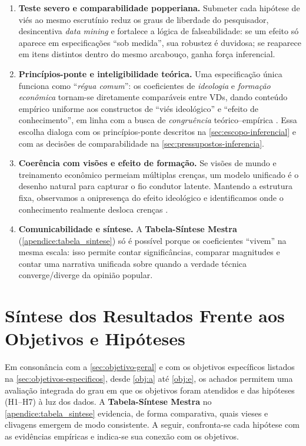 \begin{enumerate}[label=\roman*)]
\item \textbf{Teste severo e comparabilidade popperiana.} Submeter cada hipótese de viés ao mesmo escrutínio reduz os graus de liberdade do pesquisador, desincentiva \emph{data mining} e fortalece a lógica de falseabilidade: se um efeito só aparece em especificações “sob medida”, sua robustez é duvidosa; se reaparece em itens distintos dentro do mesmo arcabouço, ganha força inferencial.

\item \textbf{Princípios-ponte e inteligibilidade teórica.} Uma especificação única funciona como “\emph{régua comum}”: os coeficientes de \emph{ideologia} e \emph{formação econômica} tornam-se diretamente comparáveis entre VDs, dando conteúdo empírico uniforme aos constructos de “viés ideológico” e “efeito de conhecimento”, em linha com a busca de \emph{congruência} teórico–empírica \cite{stigum2003}. Essa escolha dialoga com os princípios-ponte descritos na \autoref{sec:escopo-inferencial} e com as decisões de comparabilidade na \autoref{sec:pressupostos-inferencia}.

\item \textbf{Coerência com visões e efeito de formação.} Se visões de mundo e treinamento econômico permeiam múltiplas crenças, um modelo unificado é o desenho natural para capturar o fio condutor latente. Mantendo a estrutura fixa, observamos a onipresença do efeito ideológico e identificamos onde o conhecimento realmente desloca crenças \cite{sowell2007conflict,newman2020ideia}. 

\item \textbf{Comunicabilidade e síntese.} A \textbf{Tabela-Síntese Mestra} (\autoref{apendice:tabela_sintese}) só é possível porque os coeficientes “vivem” na mesma escala: isso permite contar significâncias, comparar magnitudes e contar uma narrativa unificada sobre quando a verdade técnica converge/diverge da opinião popular.
\end{enumerate}

\section{Síntese dos Resultados Frente aos Objetivos e Hipóteses}\label{sec:sintese-resultados}

Em consonância com a \autoref{sec:objetivo-geral} e com os objetivos específicos listados na \autoref{sec:objetivos-especificos}, desde \autoref{obj:a} até \autoref{obj:e}, os achados permitem uma avaliação integrada do grau em que os objetivos foram atendidos e das hipóteses (H1–H7) à luz dos dados. A \textbf{Tabela-Síntese Mestra} no \autoref{apendice:tabela_sintese} evidencia, de forma comparativa, quais vieses e clivagens emergem de modo consistente. A seguir, confronta-se cada hipótese com as evidências empíricas e indica-se sua conexão com os objetivos.

